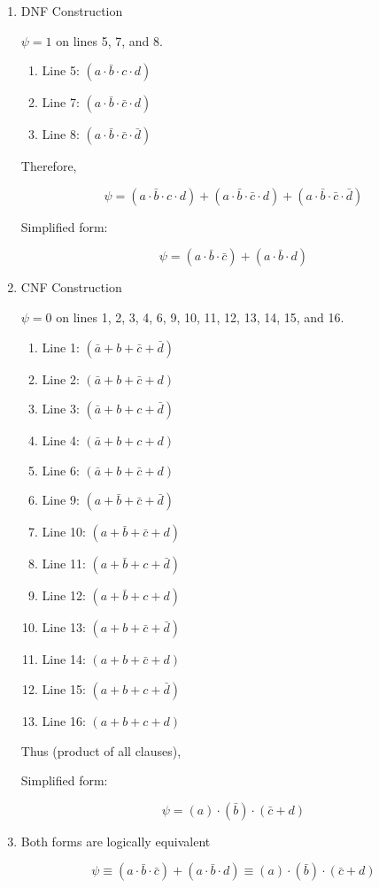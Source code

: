 \documentclass[12pt,a4paper,openany]{article}
\begin{document}
\begin{enumerate}
\item DNF Construction

  $\psi = 1$ on lines 5, 7, and 8.

  \begin{enumerate}
  \item Line 5: $(a \cdot \bar{b} \cdot c \cdot d)$
  \item Line 7: $(a \cdot \bar{b} \cdot \bar{c} \cdot d)$
  \item Line 8: $(a \cdot \bar{b} \cdot \bar{c} \cdot \bar{d})$
  \end{enumerate}

  Therefore,

  $$
   \psi = (a \cdot \bar{b} \cdot c \cdot d) + (a \cdot \bar{b} \cdot \bar{c} \cdot d) + (a \cdot \bar{b} \cdot \bar{c} \cdot \bar{d})
   $$
   
   Simplified form:
   
   $$
   \psi = (a \cdot \bar{b} \cdot \bar{c}) + (a \cdot \bar{b} \cdot d)
   $$

\item CNF Construction

  $\psi = 0$ on lines 1, 2, 3, 4, 6, 9, 10, 11, 12, 13, 14, 15, and 16.

  \begin{enumerate}
  \item Line 1: $(\bar{a} + b + \bar{c} + \bar{d})$
  \item Line 2: $(\bar{a} + b + \bar{c} + d)$
  \item Line 3: $(\bar{a} + b + c + \bar{d})$
  \item Line 4: $(\bar{a} + b + c + d)$
  \item Line 6: $(\bar{a} + b + \bar{c} + d)$
  \item Line 9: $(a + \bar{b} + \bar{c} + \bar{d})$
  \item Line 10: $(a + \bar{b} + \bar{c} + d)$
  \item Line 11: $(a + \bar{b} + c + \bar{d})$
  \item Line 12: $(a + \bar{b} + c + d)$
  \item Line 13: $(a + b + \bar{c} + \bar{d})$
  \item Line 14: $(a + b + \bar{c} + d)$
  \item Line 15: $(a + b + c + \bar{d})$
  \item Line 16: $(a + b + c + d)$
  \end{enumerate}

  Thus (product of all clauses),
  
  Simplified form:

  $$
   \psi = (a) \cdot (\bar{b}) \cdot (\bar{c} + d)
   $$

\item Both forms are logically equivalent

  $$
   \psi \equiv (a \cdot \bar{b} \cdot \bar{c}) + (a \cdot \bar{b} \cdot d) \equiv (a) \cdot (\bar{b}) \cdot (\bar{c} + d)
   $$
\end{enumerate}
\end{document}
